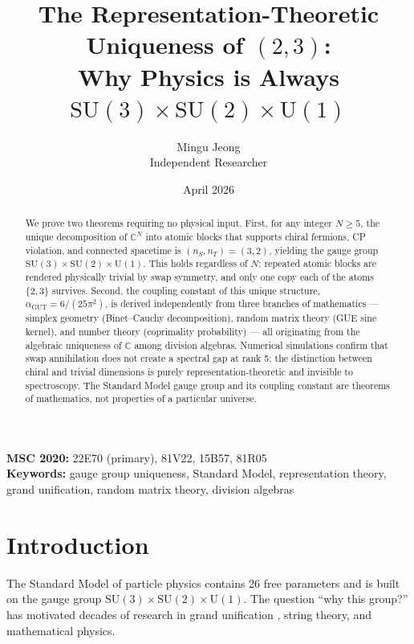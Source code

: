 \documentclass[12pt]{article}
\theoremstyle{remark}
\begin{document}
\title{The Representation-Theoretic Uniqueness of $(2,3)$:\\
Why Physics is Always $\mathrm{SU}(3)\times\mathrm{SU}(2)\times\mathrm{U}(1)$}
\author{Mingu Jeong\\Independent Researcher}
\date{April 2026}
\maketitle

\noindent
\textbf{MSC 2020:} 22E70 (primary), 81V22, 15B57, 81R05\\
\textbf{Keywords:} gauge group uniqueness, Standard Model, representation
theory, grand unification, random matrix theory, division algebras

\begin{abstract}
We prove two theorems requiring no physical input. First, for any integer $N \geq 5$, the unique decomposition of $\mathbb{C}^N$ into atomic blocks that supports chiral fermions, CP violation, and connected spacetime is $(n_S, n_T) = (3, 2)$, yielding the gauge group $\text{SU}(3)\times\text{SU}(2)\times\text{U}(1)$. This holds regardless of $N$: repeated atomic blocks are rendered physically trivial by swap symmetry, and only one copy each of the atoms $\{2, 3\}$ survives. Second, the coupling constant of this unique structure, $\alpha_\text{GUT} = 6/(25\pi^2)$, is derived independently from three branches of mathematics --- simplex geometry (Binet--Cauchy decomposition), random matrix theory (GUE sine kernel), and number theory (coprimality probability) --- all originating from the algebraic uniqueness of $\mathbb{C}$ among division algebras. Numerical simulations confirm that swap annihilation does not create a spectral gap at rank 5; the distinction between chiral and trivial dimensions is purely representation-theoretic and invisible to spectroscopy. The Standard Model gauge group and its coupling constant are theorems of mathematics, not properties of a particular universe.
\end{abstract}

\tableofcontents

\section{Introduction}

The Standard Model of particle physics contains 26 free parameters and is built on the gauge group $\text{SU}(3)\times\text{SU}(2)\times\text{U}(1)$. The question ``why this group?'' has motivated decades of research in
grand unification \cite{Georgi-Glashow, Pati-Salam}, string theory,
and mathematical physics.
\end{document}
